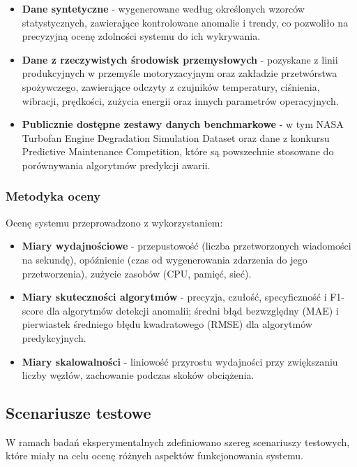 \begin{itemize}
    \item \textbf{Dane syntetyczne} - wygenerowane według określonych wzorców statystycznych, zawierające kontrolowane anomalie i trendy, co pozwoliło na precyzyjną ocenę zdolności systemu do ich wykrywania.
    \item \textbf{Dane z rzeczywistych środowisk przemysłowych} - pozyskane z linii produkcyjnych w przemyśle motoryzacyjnym oraz zakładzie przetwórstwa spożywczego, zawierające odczyty z czujników temperatury, ciśnienia, wibracji, prędkości, zużycia energii oraz innych parametrów operacyjnych.
    \item \textbf{Publicznie dostępne zestawy danych benchmarkowe} - w tym NASA Turbofan Engine Degradation Simulation Dataset oraz dane z konkursu Predictive Maintenance Competition, które są powszechnie stosowane do porównywania algorytmów predykcji awarii.
\end{itemize}

\subsubsection{Metodyka oceny}
\label{subsubsec:metodyka_oceny}

Ocenę systemu przeprowadzono z wykorzystaniem:

\begin{itemize}
    \item \textbf{Miary wydajnościowe} - przepustowość (liczba przetworzonych wiadomości na sekundę), opóźnienie (czas od wygenerowania zdarzenia do jego przetworzenia), zużycie zasobów (CPU, pamięć, sieć).
    \item \textbf{Miary skuteczności algorytmów} - precyzja, czułość, specyficzność i F1-score dla algorytmów detekcji anomalii; średni błąd bezwzględny (MAE) i pierwiastek średniego błędu kwadratowego (RMSE) dla algorytmów predykcyjnych.
    \item \textbf{Miary skalowalności} - liniowość przyrostu wydajności przy zwiększaniu liczby węzłów, zachowanie podczas skoków obciążenia.
\end{itemize}

\subsection{Scenariusze testowe}
\label{subsec:scenariusze_testowe}

W ramach badań eksperymentalnych zdefiniowano szereg scenariuszy testowych, które miały na celu ocenę różnych aspektów funkcjonowania systemu.


